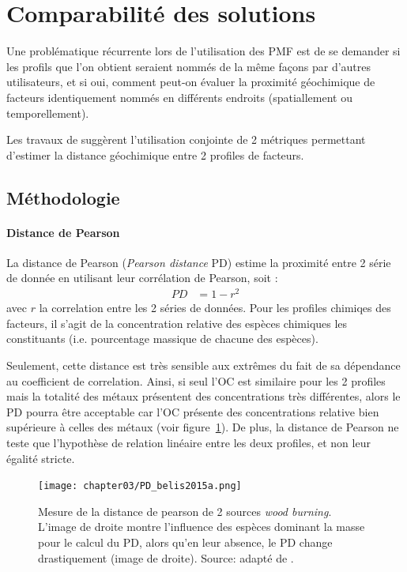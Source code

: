 \section{Comparabilité des solutions}%
\label{sub:comparabilité_des_solutions}

Une problématique récurrente lors de l'utilisation des PMF est de se demander si les
profils que l'on obtient seraient nommés de la même façons par d'autres utilisateurs, et
si oui, comment peut-on évaluer la proximité géochimique de facteurs identiquement nommés
en différents endroits (spatiallement ou temporellement).

Les travaux de \cite{belisNew2015a} suggèrent l'utilisation conjointe de 2
métriques permettant d'estimer la distance géochimique entre 2 profiles de facteurs.

\subsection{Méthodologie}%
\label{sub:méthodologie}

\paragraph{Distance de Pearson}%
\label{par:distance_de_pearson}

La distance de Pearson (\textit{Pearson distance} PD) estime la proximité entre 2 série de
donnée en utilisant leur corrélation de Pearson, soit :
\begin{align}
    \label{eq:PD}
    PD &= 1 - r^2
\end{align}
avec $r$ la correlation entre les 2 séries de données. Pour les profiles chimiqes des
facteurs, il s'agit de la concentration relative des espèces chimiques les constituants
(i.e. pourcentage massique de chacune des espèces).

Seulement, cette distance est très sensible aux extrêmes du fait de sa dépendance au
coefficient de correlation. Ainsi, si seul l'OC est similaire pour les 2 profiles mais la
totalité des métaux présentent des concentrations très différentes, alors le PD pourra
être acceptable car l'OC présente des concentrations relative bien supérieure à celles
des métaux (voir figure~\ref{fig:chapter03/PD_belis2015a}).
De plus, la distance de Pearson ne teste que l'hypothèse de relation linéaire entre les
deux profiles, et non leur égalité stricte.

\begin{figure}[ht]
    \centering
    \texttt{[image: chapter03/PD\_belis2015a.png]}
    \caption{Mesure de la distance de pearson de 2 sources \textit{wood burning}. L'image
        de droite montre l'influence des espèces dominant la masse pour le calcul du PD, alors
        qu'en leur absence, le PD change drastiquement (image de droite). Source: adapté de
        \cite[figure 3]{belisNew2015}.
}%
    \label{fig:chapter03/PD_belis2015a}
\end{figure}


